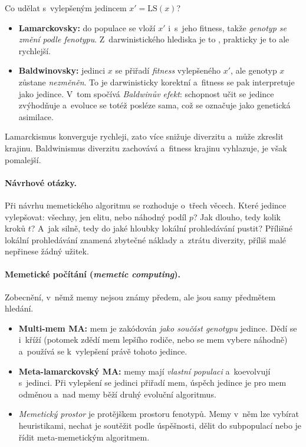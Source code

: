 \documentclass[11pt,a4paper]{article}
\theoremstyle{definition}
\begin{document}
\begin{defbox}
Co udělat s~vylepšeným jedincem $x' = \mathrm{LS}(x)$?
\begin{itemize}
\item \textbf{Lamarckovsky:} do populace se vloží $x'$ i~s~jeho fitness, takže
  \emph{genotyp se změní podle fenotypu}. Z~darwinistického hlediska je to
  , prakticky je to ale rychlejší.
\item \textbf{Baldwinovsky:} jedinci $x$ se přiřadí \emph{fitness} vylepšeného $x'$, ale
  genotyp $x$ zůstane \emph{nezměněn}. To je darwinisticky korektní a~fitness se pak
  interpretuje jako  jedince. V~tom spočívá \emph{Baldwinův efekt}:
  schopnost učit se jedince zvýhodňuje a~evoluce se totéž posléze  sama,
  což se označuje jako genetická asimilace.
\end{itemize}
Lamarckismus konverguje rychleji, zato více snižuje diverzitu a~může zkreslit krajinu.
Baldwinismus diverzitu zachovává a~fitness krajinu vyhlazuje, je však pomalejší.
\end{defbox}

\paragraph{Návrhové otázky.} Při návrhu memetického algoritmu se rozhoduje o~třech
věcech. Které jedince vylepšovat: všechny, jen elitu, nebo náhodný podíl $p$? Jak dlouho,
tedy kolik kroků $t$? A~jak silně, tedy do jaké hloubky lokální prohledávání pustit?
Přílišné lokální prohledávání znamená zbytečné náklady a~ztrátu diverzity, příliš malé
nepřinese žádný užitek.

\paragraph{Memetické počítání (\emph{memetic computing}).} Zobecnění, v~němž memy nejsou
známy předem, ale jsou samy předmětem hledání.
\begin{itemize}
\item \textbf{Multi-mem MA:} mem je zakódován \emph{jako součást genotypu} jedince.
  Dědí se i~kříží (potomek zdědí mem lepšího rodiče, nebo se mem vybere náhodně)
  a~používá se k~vylepšení právě tohoto jedince.
\item \textbf{Meta-lamarckovský MA:} memy mají \emph{vlastní populaci} a~koevolvují
  s~jedinci. Při vylepšení se jedinci přiřadí mem, úspěch jedince je pro mem odměnou
  a~nad memy běží druhý evoluční algoritmus.
\item \emph{Memetický prostor} je protějškem prostoru fenotypů. Memy v~něm lze vybírat
  heuristikami, nechat je soutěžit podle úspěšnosti, dělit do subpopulací nebo je řídit
  meta-memetickým algoritmem.
\end{itemize}
\end{document}
